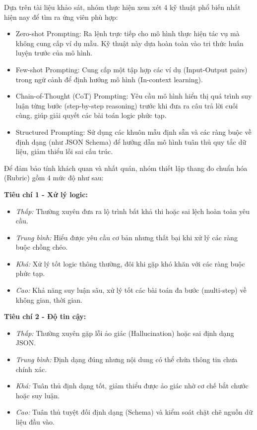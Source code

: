 
Dựa trên tài liệu khảo sát, nhóm thực hiện xem xét 4 kỹ thuật phổ biến nhất hiện nay để tìm ra ứng viên phù hợp:

\begin{itemize}
    \item Zero-shot Prompting: Ra lệnh trực tiếp cho mô hình thực hiện tác vụ mà không cung cấp ví dụ mẫu. Kỹ thuật này dựa hoàn toàn vào tri thức huấn luyện trước của mô hình.
    
    \item Few-shot Prompting: Cung cấp một tập hợp các ví dụ (Input-Output pairs) trong ngữ cảnh để định hướng mô hình (In-context learning).
    
    \item Chain-of-Thought (CoT) Prompting: Yêu cầu mô hình hiển thị quá trình suy luận từng bước (step-by-step reasoning) trước khi đưa ra câu trả lời cuối cùng, giúp giải quyết các bài toán logic phức tạp.
    
    \item Structured Prompting: Sử dụng các khuôn mẫu định sẵn và các ràng buộc về định dạng (như JSON Schema) để hướng dẫn mô hình tuân thủ quy tắc dữ liệu, giảm thiểu lỗi sai cấu trúc.
\end{itemize}


Để đảm bảo tính khách quan và nhất quán, nhóm thiết lập thang đo chuẩn hóa (Rubric) gồm 4 mức độ như sau:

\textbf{Tiêu chí 1 - Xử lý logic:}
\begin{itemize}
    \item \textit{Thấp:} Thường xuyên đưa ra lộ trình bất khả thi hoặc sai lệch hoàn toàn yêu cầu.
    \item \textit{Trung bình:} Hiểu được yêu cầu cơ bản nhưng thất bại khi xử lý các ràng buộc chồng chéo.
    \item \textit{Khá:} Xử lý tốt logic thông thường, đôi khi gặp khó khăn với các ràng buộc phức tạp.
    \item \textit{Cao:} Khả năng suy luận sâu, xử lý tốt các bài toán đa bước (multi-step) về không gian, thời gian.
\end{itemize}

\textbf{Tiêu chí 2 - Độ tin cậy:}
\begin{itemize}
    \item \textit{Thấp:} Thường xuyên gặp lỗi ảo giác (Hallucination) hoặc sai định dạng JSON.
    \item \textit{Trung bình:} Định dạng đúng nhưng nội dung có thể chứa thông tin chưa chính xác.
    \item \textit{Khá:} Tuân thủ định dạng tốt, giảm thiểu được ảo giác nhờ cơ chế bắt chước hoặc suy luận.
    \item \textit{Cao:} Tuân thủ tuyệt đối định dạng (Schema) và kiểm soát chặt chẽ nguồn dữ liệu đầu vào.
\end{itemize}

